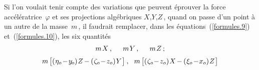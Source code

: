 \documentclass[11pt, twoside, leqno]{article}
\renewcommand{\eqref}[1]{(\ref{#1})}
\begin{document}
Si l'on voulait tenir compte des variations que peuvent éprouver la force accélératrice~\;$\varphi$\; et ses projections algébriques \hbox{\;$X$,\;$Y$,\;$Z$\,},\hspace{.5ex} quand on passe d'un point à un autre de la masse~\;$m$\,,\hspace{.5ex} il faudrait remplacer, dans les équations~\eqref{formules.9} et~\eqref{formules.10}, les six quantités
\begin{equation*}
\begin{array}{c}
m \hspace{.2ex} X \hspace{.4ex} \text{,} \hspace{1.6em}
m \hspace{.2ex} Y \hspace{.4ex} \text{,} \hspace{1.6em}
m \hspace{.2ex} Z \hspace{.4ex} \text{;}
\\[.6em]
m \hspace{1.5pt} \bigl[ (\hspace{.1ex} \eta_o \hspace{-0.3ex}-\hspace{-0.3ex} y_{\hspace{-0.14ex}o} ) \hspace{.15ex} Z \hspace{-0.2ex} - \hspace{-0.1ex} (\hspace{.1ex} \zeta_o \hspace{-0.4ex}-\hspace{-0.3ex} z_o ) \hspace{.15ex} Y \hspace{.15ex}\bigr]
\hspace{.5ex} \text{,} \hspace{.8em}
m \hspace{1.5pt} \bigl[ (\hspace{.1ex} \zeta_o \hspace{-0.4ex}-\hspace{-0.3ex} z_o ) \hspace{.15ex} X \hspace{-0.2ex} - \hspace{-0.1ex} (\hspace{.1ex} \xi_o \hspace{-0.3ex}-\hspace{-0.4ex} x_o ) \hspace{.15ex} Z \hspace{.15ex}\bigr]

\end{array}
\end{equation*}
\end{document}
